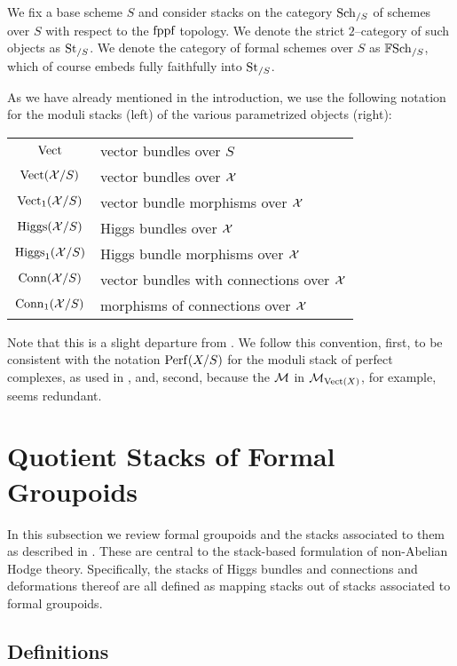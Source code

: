 \documentclass[11pt]{amsart}
\begin{document}
We fix a base scheme $S$ and consider stacks on the category $\mathrm{Sch}_{/S}$ of
schemes over $S$ with respect to the $\text{fppf}$ topology.
We denote the strict $2$--category of such objects as $\mathrm{St}_{/S}$.
We denote the category of formal schemes over $S$ as $\mathbb{F}\mathrm{Sch}_{/S}$, which
of course embeds fully faithfully into $\mathrm{St}_{/S}$.

As we have already mentioned in the introduction, we use the following
notation for the moduli stacks (left) of the various parametrized
objects (right):
\begin{center}
\begin{tabular}{c l}
$\mathrm{Vect}$ & vector bundles over $S$ \\
$\mathrm{Vect}(\mathcal{X}/S)$ & vector bundles over $\mathcal{X}$ \\
$\mathrm{Vect}_1(\mathcal{X}/S)$ & vector bundle morphisms over $\mathcal{X}$ \\
$\mathrm{Higgs}(\mathcal{X}/S)$ & Higgs bundles over $\mathcal{X}$ \\
$\mathrm{Higgs}_1(\mathcal{X}/S)$ & Higgs bundle morphisms over $\mathcal{X}$ \\
$\mathrm{Conn}(\mathcal{X}/S)$ & vector bundles with connections over $\mathcal{X}$ \\
$\mathrm{Conn}_1(\mathcal{X}/S)$ & morphisms of connections over $\mathcal{X}$
\end{tabular}
\end{center}
Note that this is a slight departure from \cite{ModQuivBun}. We follow this
convention, first, to be consistent with the notation $\mathrm{Perf}(X/S)$
for the moduli stack of perfect complexes, as used in \cite{GeomNonAbHodgeFilt},
and, second, because the $\mathcal{M}$ in $\mathcal{M}_{\mathrm{Vect}(X)}$, for example,
seems redundant.


\section{Quotient Stacks of Formal Groupoids}

In this subsection we review formal groupoids and the stacks associated
to them as described in \cite[\S 3.1]{GeomNonAbHodgeFilt}. These are central
to the stack-based formulation of non-Abelian Hodge theory. Specifically,
the stacks of Higgs bundles and connections and deformations thereof
are all defined as mapping stacks out of stacks associated to formal
groupoids.

\subsection{Definitions}
\end{document}

